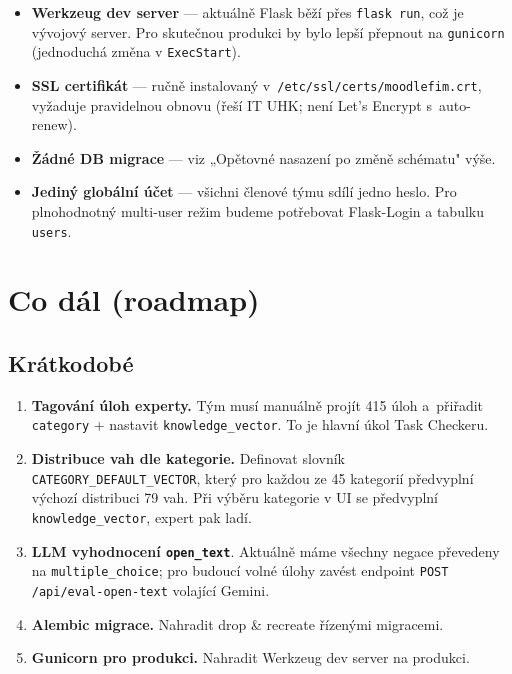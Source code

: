 \documentclass[11pt,a4paper]{article}
\begin{document}
\begin{itemize}
  \item \textbf{Werkzeug dev server} --- aktuálně Flask běží přes \texttt{flask run}, což je vývojový server. Pro skutečnou produkci by bylo lepší přepnout na \texttt{gunicorn} (jednoduchá změna v \texttt{ExecStart}).
  \item \textbf{SSL certifikát} --- ručně instalovaný v~\texttt{/etc/ssl/certs/moodlefim.crt}, vyžaduje pravidelnou obnovu (řeší IT UHK; není Let's Encrypt s~auto-renew).
  \item \textbf{Žádné DB migrace} --- viz „Opětovné nasazení po změně schématu" výše.
  \item \textbf{Jediný globální účet} --- všichni členové týmu sdílí jedno heslo. Pro plnohodnotný multi-user režim budeme potřebovat Flask-Login a tabulku \texttt{users}.
\end{itemize}

\section{Co dál (roadmap)}

\subsection{Krátkodobé}

\begin{enumerate}
  \item \textbf{Tagování úloh experty.} Tým musí manuálně projít 415 úloh a~přiřadit \texttt{category} + nastavit \texttt{knowledge\_vector}. To je hlavní úkol Task Checkeru.
  \item \textbf{Distribuce vah dle kategorie.} Definovat slovník \texttt{CATEGORY\_DEFAULT\_VECTOR}, který pro každou ze 45 kategorií předvyplní výchozí distribuci 79 vah. Při výběru kategorie v UI se předvyplní \texttt{knowledge\_vector}, expert pak ladí.
  \item \textbf{LLM vyhodnocení \texttt{open\_text}}. Aktuálně máme všechny negace převedeny na \texttt{multiple\_choice}; pro budoucí volné úlohy zavést endpoint \texttt{POST /api/eval-open-text} volající Gemini.
  \item \textbf{Alembic migrace.} Nahradit drop \& recreate řízenými migracemi.
  \item \textbf{Gunicorn pro produkci.} Nahradit Werkzeug dev server na produkci.
\end{enumerate}
\end{document}
